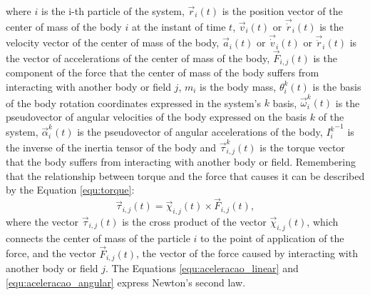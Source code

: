 where $i$ is the i-th particle of the system, $\vec{r}_{i}(t)$ is the position vector of the center of mass of the body $i$ at the instant of time $t$, $\vec{v}_{i}(t)$ or $\vec{\dot{r}}_{i}(t)$ is the velocity vector of the center of mass of the body, $\vec{a}_{i}(t)$ or $\vec{\dot{v}}_{i}(t)$ or $\vec{\ddot{r}}_{i}(t)$ is the vector of accelerations of the center of mass of the body, $\vec{F}_{i,j}(t)$ is the component of the force that the center of mass of the body suffers from interacting with another body or field $j$, $m_{i}$ is the body mass, $\theta^{k}_{i}(t)$ is the basis of the body rotation coordinates expressed in the system's $k$ basis, $\vec{\omega}^{k}_{i}(t)$ is the pseudovector of angular velocities of the body expressed on the basis $k$ of the system, $\vec{\alpha}^{k}_{i}(t)$ is the pseudovector of angular accelerations of the body, ${I^{k}_{i}}^{-1}$ is the inverse of the inertia tensor of the body and $\vec{\tau}^{k}_{i,j}(t)$ is the torque vector that the body suffers from interacting with another body or field. Remembering that the relationship between torque and the force that causes it can be described by the Equation \ref{equ:torque}:
\begin{equation}
    \label{equ:torque}
    \vec{\tau}_{i,j}(t) = \vec{\chi}_{i,j}(t) \times \vec{F}_{i,j}(t),
\end{equation}
where the vector $\vec{\tau}_{i,j}(t)$ is the cross product of the vector $\vec{\chi}_{i,j}(t)$, which connects the center of mass of the particle $i$ to the point of application of the force, and the vector $\vec{F}_{i,j}(t)$, the vector of the force caused by interacting with another body or field $j$. The Equations \ref{equ:aceleracao_linear} and \ref{equ:aceleracao_angular} express Newton's second law. 

